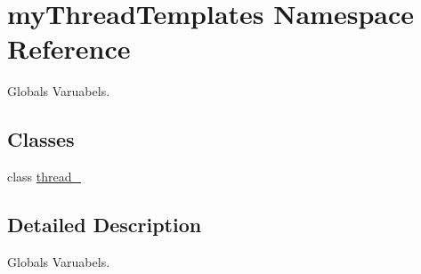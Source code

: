 \hypertarget{namespacemyThreadTemplates}{
\section{myThreadTemplates Namespace Reference}
\label{namespacemyThreadTemplates}
}


Globals Varuabels.  


\subsection*{Classes}
\begin{DoxyCompactItemize}
\item 
class \hyperlink{classmyThreadTemplates_1_1thread__1}{thread\_}
\end{DoxyCompactItemize}


\subsection{Detailed Description}
Globals Varuabels. 